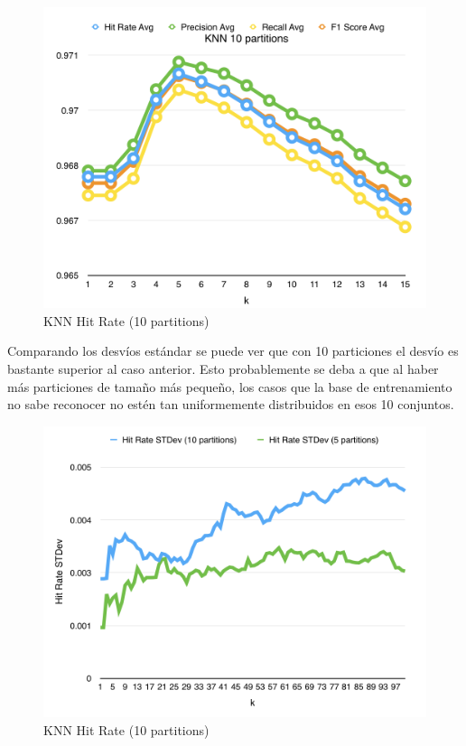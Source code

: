 \begin{figure}[h!]
  \begin{center}
	\includegraphics[scale=0.7]{exp1/KNN-10p-Scores.png}
	\caption{KNN Hit Rate (10 partitions)}
  \end{center}
\end{figure}

Comparando los desvíos estándar se puede ver que con 10 particiones el desvío es bastante superior al caso anterior. Esto probablemente se deba a que al haber más particiones de tamaño más pequeño, los casos que la base de entrenamiento no sabe reconocer no estén tan uniformemente distribuidos en esos 10 conjuntos.\\ 

\begin{figure}[h!]
  \begin{center}
	\includegraphics[scale=0.7]{exp1/KNN-Hit-Rate-stdev.png}
	\caption{KNN Hit Rate (10 partitions)}
  \end{center}
\end{figure}


